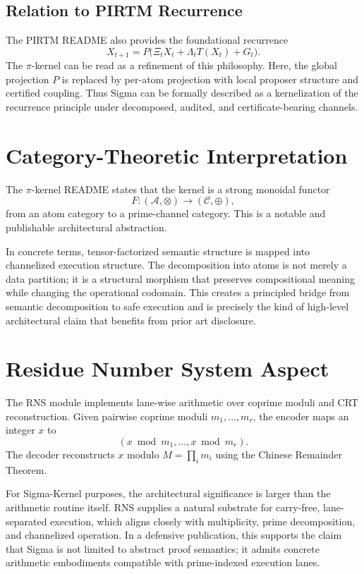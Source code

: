 \documentclass[11pt]{article}
\begin{document}
\subsection{Relation to PIRTM Recurrence}
The PIRTM README also provides the foundational recurrence
\[
X_{t+1} = P\big(\Xi_t X_t + \Lambda_t T(X_t) + G_t\big).
\]
The $\pi$-kernel can be read as a refinement of this philosophy. Here, the global projection $P$ is replaced by per-atom projection with local proposer structure and certified coupling. Thus Sigma can be formally described as a kernelization of the recurrence principle under decomposed, audited, and certificate-bearing channels.

\section{Category-Theoretic Interpretation}
The $\pi$-kernel README states that the kernel is a strong monoidal functor
\[
F : (\mathcal{A}, \otimes) \to (\mathcal{C}, \oplus),
\]
from an atom category to a prime-channel category. This is a notable and publishable architectural abstraction.

In concrete terms, tensor-factorized semantic structure is mapped into channelized execution structure. The decomposition into atoms is not merely a data partition; it is a structural morphism that preserves compositional meaning while changing the operational codomain. This creates a principled bridge from semantic decomposition to safe execution and is precisely the kind of high-level architectural claim that benefits from prior art disclosure.

\section{Residue Number System Aspect}
The RNS module implements lane-wise arithmetic over coprime moduli and CRT reconstruction. Given pairwise coprime moduli $m_1,\dots,m_r$, the encoder maps an integer $x$ to
\[
(x \bmod m_1, \dots, x \bmod m_r).
\]
The decoder reconstructs $x$ modulo $M = \prod_i m_i$ using the Chinese Remainder Theorem.

For Sigma-Kernel purposes, the architectural significance is larger than the arithmetic routine itself. RNS supplies a natural substrate for carry-free, lane-separated execution, which aligns closely with multiplicity, prime decomposition, and channelized operation. In a defensive publication, this supports the claim that Sigma is not limited to abstract proof semantics; it admits concrete arithmetic embodiments compatible with prime-indexed execution lanes.
\end{document}
